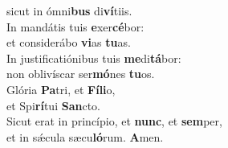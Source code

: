 \evenverse sicut in ómni\textbf{bus} di\textbf{ví}tiis.\\
\oddverse In mandátis tuis \textbf{e}xer\textbf{cé}bor:~\*\\
\oddverse et considerábo \textbf{vi}as \textbf{tu}as.\\
\evenverse In justificatiónibus tuis \textbf{me}di\textbf{tá}bor:~\*\\
\evenverse non oblivíscar ser\textbf{mó}nes \textbf{tu}os.\\
\oddverse Glória \textbf{Pa}tri, et \textbf{Fí}\textbf{li}o,~\*\\
\oddverse et Spi\textbf{rí}tui \textbf{San}cto.\\
\evenverse Sicut erat in princípio, et \textbf{nunc}, et \textbf{sem}per,~\*\\
\evenverse et in sǽcula sæcu\textbf{ló}rum. \textbf{A}men.\\
